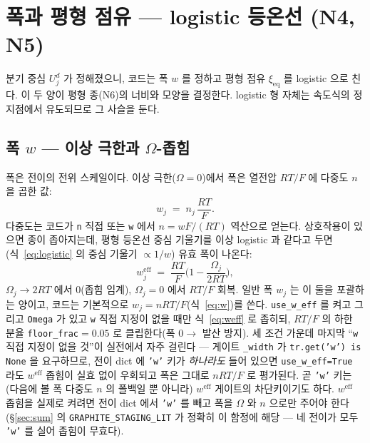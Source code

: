 \documentclass[11pt,a4paper]{article}
\newcommand{\eff}{\mathrm{eff}}
\newcommand{\eq}{\mathrm{eq}}
\begin{document}
\section{폭과 평형 점유 — logistic 등온선 (N4, N5)}\label{sec:width}
분기 중심 $U_j^d$ 가 정해졌으니, 코드는 폭 $w$ 를 정하고 평형 점유 $\xi_\eq$ 를 logistic 으로 친다. 이 두 양이 평형 종(N6)의 너비와 모양을 결정한다. logistic 형 자체는 속도식의 정지점에서 유도되므로 그 사슬을 둔다.

\subsection{폭 $w$ — 이상 극한과 $\Omega$-좁힘}
폭은 전이의 전위 스케일이다. 이상 극한($\Omega=0$)에서 폭은 열전압 $RT/F$ 에 다중도 $n$ 을 곱한 값:
\begin{equation}
w_j\;=\;n_j\,\frac{RT}{F}.
\label{eq:w}
\end{equation}
다중도는 코드가 \texttt{n} 직접 또는 \texttt{w} 에서 $n=wF/(RT)$ 역산으로 얻는다. 상호작용이 있으면 종이 좁아지는데, 평형 등온선 중심 기울기를 이상 logistic 과 같다고 두면(식~\eqref{eq:logistic} 의 중심 기울기 $\propto1/w$) 유효 폭이 나온다:
\begin{equation}
w_j^\eff\;=\;\frac{RT}{F}\Big(1-\frac{\Omega_j}{2RT}\Big),
\label{eq:weff}
\end{equation}
$\Omega_j\to2RT$ 에서 $0$(좁힘 임계), $\Omega_j=0$ 에서 $RT/F$ 회복. 일반 폭 $w_j$ 는 이 둘을 포괄하는 양이고, 코드는 기본적으로 $w_j=nRT/F$(식~\eqref{eq:w})를 쓴다. \texttt{use\_w\_eff} 를 켜고 그리고 \texttt{Omega} 가 있고 \texttt{w} 직접 지정이 없을 때만 식~\eqref{eq:weff} 로 좁히되, $RT/F$ 의 하한 분율 \texttt{floor\_frac}$=0.05$ 로 클립한다(폭 $0\to$ 발산 방지). 세 조건 가운데 마지막 ``\texttt{w} 직접 지정이 없을 것''이 실전에서 자주 걸린다 — 게이트 \texttt{\_width} 가 \texttt{tr.get('w') is None} 을 요구하므로, 전이 dict 에 \texttt{'w'} 키가 \emph{하나라도} 들어 있으면 \texttt{use\_w\_eff=True} 라도 $w^\eff$ 좁힘이 실효 없이 우회되고 폭은 그대로 $nRT/F$ 로 평가된다. 곧 \texttt{'w'} 키는 (다음에 볼 폭 다중도 $n$ 의 폴백일 뿐 아니라) $w^\eff$ 게이트의 차단키이기도 하다. $w^\eff$ 좁힘을 실제로 켜려면 전이 dict 에서 \texttt{'w'} 를 빼고 폭을 $\Omega$ 와 $n$ 으로만 주어야 한다(\S\ref{sec:sum} 의 \texttt{GRAPHITE\_STAGING\_LIT} 가 정확히 이 함정에 해당 — 네 전이가 모두 \texttt{'w'} 를 실어 좁힘이 무효다).
\end{document}
